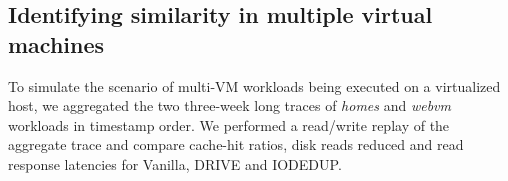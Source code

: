 %
%

\subsection{Identifying similarity in multiple virtual machines}
To simulate the scenario of multi-VM workloads being executed on a
virtualized host, we aggregated the two three-week long traces of
\textit{homes} and \textit{webvm} workloads in timestamp order. We 
performed a read/write replay of the aggregate trace and compare
cache-hit ratios, disk reads reduced and read response latencies for
Vanilla, DRIVE and IODEDUP. 


